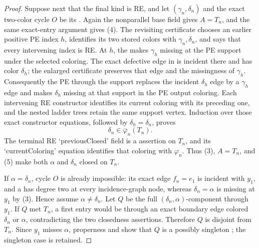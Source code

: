 \begin{proof}
Suppose next that the final kind is RE, and let
$(\gamma_n,\delta_n)$ and the exact two-color cycle $O$ be its
.  Again the nonparallel base
field gives $A=T_n$, and the same exact-entry argument gives (4).
The revisiting certificate chooses an earlier positive PE index $h$,
identifies its two stored colors with $\gamma_n,\delta_n$, and says that
every intervening index is RE.  At $h$, the
 makes $\gamma_h$ missing at the PE
support under the selected coloring.  The exact defective edge in
 is incident there and has color
$\delta_h$; the enlarged  certificate preserves
that edge and the missingness of $\gamma_h$.  Consequently the PE
 through the support replaces the
incident $\delta_h$ edge by a $\gamma_h$ edge and makes $\delta_h$
missing at that support in the PE output coloring.  Each intervening RE
constructor identifies its current coloring with its preceding one, and
the nested ladder trees retain the same support vertex.  Induction over
those exact constructor equations, followed by
$\delta_h=\delta_n$, proves
\[
                         \delta_n\in\overline\varphi_n(T_n).  \tag{5}
\]
The terminal RE `previousClosed' field is a
 assertion on $T_n$, and its
`currentColoring' equation identifies that coloring with $\varphi_n$.
Thus (3), $A=T_n$, and (5) make both $\alpha$ and $\delta_n$ closed on
$T_n$.

If $\alpha=\delta_n$, cycle $O$ is already impossible: its exact edge
$f_n=e_1$ is incident with $y_1$, and a
 has degree two at every incidence-graph node,
whereas $\delta_n=\alpha$ is missing at $y_1$ by (3).  Hence assume
$\alpha\ne\delta_n$.  Let $Q$ be the full
$(\delta_n,\alpha)$-component through $y_1$.  If $Q$ met $T_n$, a
first entry would be through an exact boundary edge colored
$\delta_n$ or $\alpha$, contradicting the two closedness assertions.
Therefore $Q$ is disjoint from $T_n$.  Since $y_1$ misses $\alpha$,
properness and  show that $Q$
is a possibly singleton ; the singleton
case is retained.


\end{proof}
